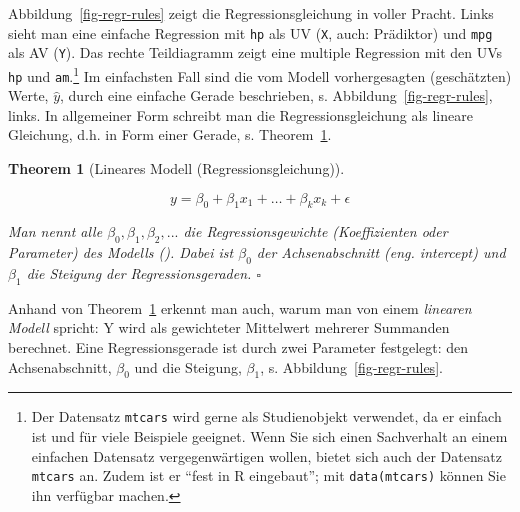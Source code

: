 \documentclass[
  ngerman,
  letterpaper,
  twoside,
  open=any]{scrbook}
\theoremstyle{definition}
\theoremstyle{plain}
\newtheorem{theorem}{Theorem}[chapter]
\theoremstyle{definition}
\theoremstyle{definition}
\theoremstyle{remark}
\begin{document}
Abbildung~\ref{fig-regr-rules} zeigt die Regressionsgleichung in voller
Pracht. Links sieht man eine einfache Regression mit \texttt{hp} als UV
(\texttt{X}, auch: Prädiktor) und \texttt{mpg} als AV (\texttt{Y}). Das
rechte Teildiagramm zeigt eine multiple Regression mit den UVs
\texttt{hp} und \texttt{am}.\footnote{Der Datensatz \texttt{mtcars} wird
  gerne als Studienobjekt verwendet, da er einfach ist und für viele
  Beispiele geeignet. Wenn Sie sich einen Sachverhalt an einem einfachen
  Datensatz vergegenwärtigen wollen, bietet sich auch der Datensatz
  \texttt{mtcars} an. Zudem ist er \enquote{fest in R eingebaut}; mit
  \texttt{data(mtcars)} können Sie ihn verfügbar machen.} Im einfachsten
Fall sind die vom Modell vorhergesagten (geschätzten) Werte,
\(\hat{y}\), durch eine einfache Gerade beschrieben, s.
Abbildung~\ref{fig-regr-rules}, links. In allgemeiner Form schreibt man
die Regressionsgleichung als lineare Gleichung, d.h. in Form einer
Gerade, s. Theorem~\ref{thm-lm}.

\begin{theorem}[Lineares Modell
(Regressionsgleichung)]\protect\hypertarget{thm-lm}{}\label{thm-lm}

\[y = \beta_0 + \beta_1 x_1 + \ldots + \beta_k x_k + \epsilon\]

Man nennt alle \(\beta_0, \beta_1, \beta_2, ...\) die
\emph{Regressionsgewichte} (\emph{Koeffizienten} oder \emph{Parameter})
des Modells (). Dabei ist
\(\beta_0\) der \emph{Achsenabschnitt} (eng. intercept) und \(\beta_1\)
die \emph{Steigung} der Regressionsgeraden. \(\square\)

\end{theorem}

Anhand von Theorem~\ref{thm-lm} erkennt man auch, warum man von einem
\emph{linearen Modell} spricht: Y wird als gewichteter Mittelwert
mehrerer Summanden berechnet. Eine Regressionsgerade ist durch zwei
Parameter festgelegt: den Achsenabschnitt, \(\beta_0\) und die Steigung,
\(\beta_1\), s. Abbildung~\ref{fig-regr-rules}.
\end{document}
